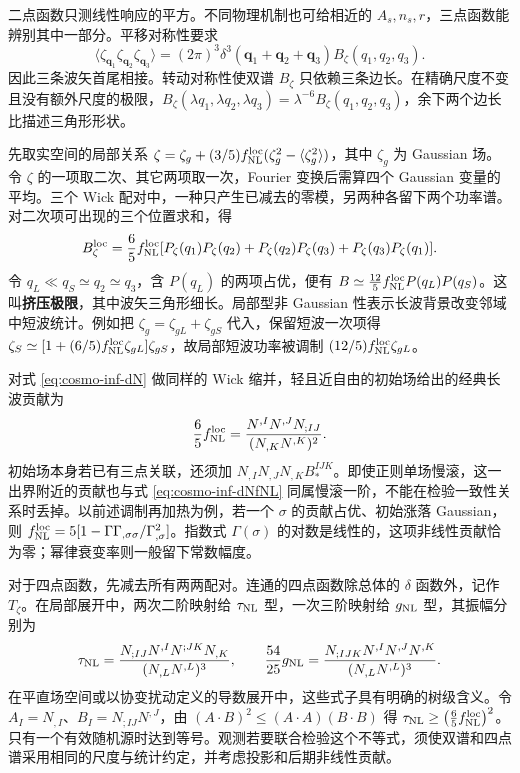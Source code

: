 二点函数只测线性响应的平方。不同物理机制也可给相近的 $A_s,n_s,r$，三点函数能辨别其中一部分。平移对称性要求
\[
 \langle\zeta_{\bm q_1}\zeta_{\bm q_2}\zeta_{\bm q_3}\rangle
 =(2\pi)^3\delta^3(\bm q_1+\bm q_2+\bm q_3)
 B_\zeta(q_1,q_2,q_3).
\]
因此三条波矢首尾相接。转动对称性使双谱 $B_\zeta$ 只依赖三条边长。在精确尺度不变且没有额外尺度的极限，$B_\zeta(\lambda q_1,\lambda q_2,\lambda q_3)=\lambda^{-6}B_\zeta(q_1,q_2,q_3)$，余下两个边长比描述三角形形状。

先取实空间的局部关系 $\zeta=\zeta_g+(3/5)f_{\rm NL}^{\rm loc}(\zeta_g^2-\langle\zeta_g^2\rangle)$，其中 $\zeta_g$ 为 Gaussian 场。令 $\zeta$ 的一项取二次、其它两项取一次，Fourier 变换后需算四个 Gaussian 变量的平均。三个 Wick 配对中，一种只产生已减去的零模，另两种各留下两个功率谱。对二次项可出现的三个位置求和，得
\begin{equation}\label{eq:cosmo-inf-local}
 B_\zeta^{\rm loc}
 =\frac65 f_{\rm NL}^{\rm loc}
 [P_\zeta(q_1)P_\zeta(q_2)+P_\zeta(q_2)P_\zeta(q_3)
                         +P_\zeta(q_3)P_\zeta(q_1)] .
\end{equation}
令 $q_L\ll q_S\simeq q_2\simeq q_3$，含 $P(q_L)$ 的两项占优，便有 $B\simeq\tfrac{12}{5}f_{\rm NL}^{\rm loc}P(q_L)P(q_S)$。这叫\textbf{挤压极限}，其中波矢三角形细长。局部型非 Gaussian 性表示长波背景改变邻域中短波统计。例如把 $\zeta_g=\zeta_{gL}+\zeta_{gS}$ 代入，保留短波一次项得 $\zeta_S\simeq[1+(6/5)f_{\rm NL}^{\rm loc}\zeta_{gL}]\zeta_{gS}$，故局部短波功率被调制 $(12/5)f_{\rm NL}^{\rm loc}\zeta_{gL}$。

对式 \eqref{eq:cosmo-inf-dN} 做同样的 Wick 缩并，轻且近自由的初始场给出的经典长波贡献为
\begin{equation}\label{eq:cosmo-inf-dNfNL}
 \frac65 f_{\rm NL}^{\rm loc}
 =\frac{N^{,I}N^{,J}N_{;IJ}}{(N_{,K}N^{,K})^2}.
\end{equation}
初始场本身若已有三点关联，还须加 $N_{,I}N_{,J}N_{,K}B_*^{IJK}$。即使正则单场慢滚，这一出界附近的贡献也与式 \eqref{eq:cosmo-inf-dNfNL} 同属慢滚一阶，不能在检验一致性关系时丢掉。以前述调制再加热为例，若一个 $\sigma$ 的贡献占优、初始涨落 Gaussian，则 $f_{\rm NL}^{\rm loc}=5[1-\Gamma\Gamma_{,\sigma\sigma}/\Gamma_{,\sigma}^2]$。指数式 $\Gamma(\sigma)$ 的对数是线性的，这项非线性贡献恰为零；幂律衰变率则一般留下常数幅度。

对于四点函数，先减去所有两两配对。连通的四点函数除总体的 $\delta$ 函数外，记作 $T_\zeta$。在局部展开中，两次二阶映射给 $\tau_{\rm NL}$ 型，一次三阶映射给 $g_{\rm NL}$ 型，其振幅分别为
\[
 \tau_{\rm NL}
 =\frac{N_{;IJ}N^{,I}N^{;JK}N_{,K}}{(N_{,L}N^{,L})^3},
 \qquad
 \frac{54}{25}g_{\rm NL}
 =\frac{N_{;IJK}N^{,I}N^{,J}N^{,K}}{(N_{,L}N^{,L})^3}.
\]
在平直场空间或以协变扰动定义的导数展开中，这些式子具有明确的树级含义。令 $A_I=N_{,I}$、$B_I=N_{;IJ}N^{,J}$，由 $(A\cdot B)^2\leq(A\cdot A)(B\cdot B)$ 得 $\tau_{\rm NL}\geq\left(\tfrac65f_{\rm NL}^{\rm loc}\right)^2$。只有一个有效随机源时达到等号。观测若要联合检验这个不等式，须使双谱和四点谱采用相同的尺度与统计约定，并考虑投影和后期非线性贡献。

